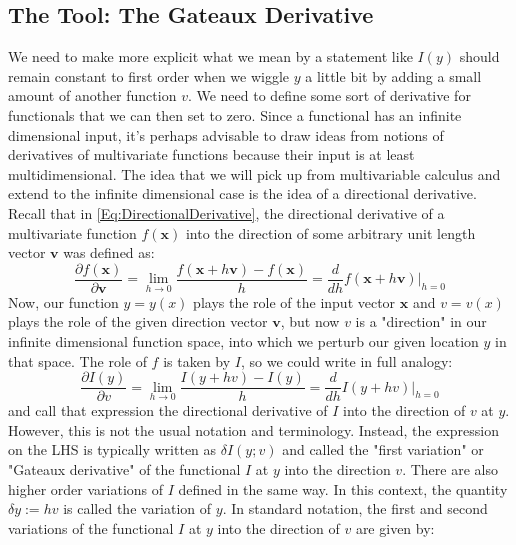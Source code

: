 
\subsection{The Tool: The Gateaux Derivative}
We need to make more explicit what we mean by a statement like $I(y)$ should remain constant to first order when we wiggle $y$ a little bit by adding a small amount of another function $v$. We need to define some sort of derivative for functionals that we can then set to zero. Since a functional has an infinite dimensional input, it's perhaps advisable to draw ideas from notions of derivatives of multivariate functions because their input is at least multidimensional. The idea that we will pick up from multivariable calculus and extend to the infinite dimensional case is the idea of a directional derivative. Recall that in \ref{Eq:DirectionalDerivative}, the directional derivative of a multivariate function $f(\mathbf{x})$ into the direction of some arbitrary unit length vector $\mathbf{v}$ was defined as:
\begin{equation}
 \frac{\partial f(\mathbf{x}) }{\partial \mathbf{v}} 
 = \lim_{h \rightarrow 0} \frac{f(\mathbf{x} + h \mathbf{v} ) - f(\mathbf{x})}{h}
 = \frac{d}{d h} f(\mathbf{x} + h \mathbf{v}) \bigg\rvert_{h=0}
\end{equation}
Now, our function $y = y(x)$ plays the role of the input vector $\mathbf{x}$ and $v = v(x)$ plays the role of  the given direction vector $\mathbf{v}$, but now $v$ is a "direction" in our infinite dimensional function space, into which we perturb our given location $y$ in that space. The role of $f$ is taken by $I$, so we could write in full analogy:
\begin{equation}
 \frac{\partial I(y) }{\partial v} 
 = \lim_{h \rightarrow 0} \frac{I(y + h v ) - I(y)}{h}
 = \frac{d}{d h} I(y + h v) \bigg\rvert_{h=0}
\end{equation}
and call that expression the directional derivative of $I$ into the direction of $v$ at $y$. However, this is not the usual notation and terminology. Instead, the expression on the LHS is typically written as $\delta I(y;v)$ and called the "first variation" or  "Gateaux derivative" of the functional $I$ at $y$ into the direction $v$. There are also higher order variations of $I$ defined in the same way. In this context, the quantity $\delta y := h v$ is called the variation of $y$.  In standard notation, the first and second variations of the functional $I$ at $y$ into the direction of $v$ are given by:
